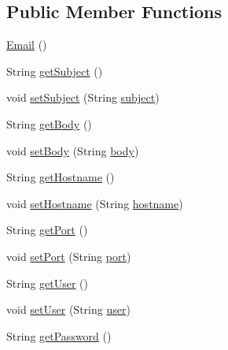 \subsection*{Public Member Functions}
\begin{DoxyCompactItemize}
\item 
\hyperlink{classbr_1_1usp_1_1cata_1_1model_1_1_email_adc0fd7fe5f4d1c82def2d4508b362eca}{Email} ()
\item 
String \hyperlink{classbr_1_1usp_1_1cata_1_1model_1_1_email_a3ad1df28ba75721498b67d4d40528417}{get\+Subject} ()
\item 
void \hyperlink{classbr_1_1usp_1_1cata_1_1model_1_1_email_aadbbbe88dcddd924224347343572c96b}{set\+Subject} (String \hyperlink{classbr_1_1usp_1_1cata_1_1model_1_1_email_a4c5ca463c3db38d15f893ed8e2ec8f8f}{subject})
\item 
String \hyperlink{classbr_1_1usp_1_1cata_1_1model_1_1_email_a246a39166a0dc1f844e7e83e3c635022}{get\+Body} ()
\item 
void \hyperlink{classbr_1_1usp_1_1cata_1_1model_1_1_email_ad16e1f34722b3283df83d755f5d4dd31}{set\+Body} (String \hyperlink{classbr_1_1usp_1_1cata_1_1model_1_1_email_a4bd8b5c8a814752d6f98a01bd231a37b}{body})
\item 
String \hyperlink{classbr_1_1usp_1_1cata_1_1model_1_1_email_aecf3c5a1d7fef1a4215398236d41f69e}{get\+Hostname} ()
\item 
void \hyperlink{classbr_1_1usp_1_1cata_1_1model_1_1_email_a1ebee48ef5becc771c85846e1887181a}{set\+Hostname} (String \hyperlink{classbr_1_1usp_1_1cata_1_1model_1_1_email_ac7c7a138711655396f5ff6784f9fa720}{hostname})
\item 
String \hyperlink{classbr_1_1usp_1_1cata_1_1model_1_1_email_a09d46ba04030a629931ceac3314f7f64}{get\+Port} ()
\item 
void \hyperlink{classbr_1_1usp_1_1cata_1_1model_1_1_email_a9504b34d763bd40edd1d4ab7b248eaad}{set\+Port} (String \hyperlink{classbr_1_1usp_1_1cata_1_1model_1_1_email_a6dfbe1e23003fbd851bce14c0568dcf8}{port})
\item 
String \hyperlink{classbr_1_1usp_1_1cata_1_1model_1_1_email_ac241ff2ef5dd558f376c0b191dad793f}{get\+User} ()
\item 
void \hyperlink{classbr_1_1usp_1_1cata_1_1model_1_1_email_a06889f561b79ed20f28ecfdb791afe57}{set\+User} (String \hyperlink{classbr_1_1usp_1_1cata_1_1model_1_1_email_a3d21f816dce9038a65e12ff5476dda12}{user})
\item 
String \hyperlink{classbr_1_1usp_1_1cata_1_1model_1_1_email_ab99ff21dc761811769038e23d070a88c}{get\+Password} ()

\end{DoxyCompactItemize}
